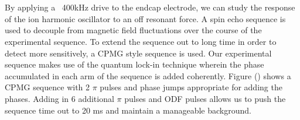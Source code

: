 \documentclass[aps,prl,preprint,groupedaddress]{revtex4-1}
\begin{document}
\begin{figure}
\centering
  \\
  \hfill
  \\
  \caption{}\label{fig:2}
\end{figure}

By applying a ~400kHz drive to the endcap electrode, we can study the response of the ion harmonic oscillator to an off resonant force. A spin echo sequence is used to decouple from magnetic field fluctuations over the course of the experimental sequence. To extend the sequence out to long time in order to detect more sensitively, a CPMG style sequence is used. Our experimental sequence makes use of the quantum lock-in technique wherein the phase accumulated in each arm of the sequence is added coherently. Figure () shows a CPMG sequence with 2 $\pi$ pulses and phase jumps appropriate for adding the phases. Adding in 6 additional $\pi$ pulses and ODF pulses allows us to push the sequence time out to 20 ms and maintain a manageable background. 
\end{document}
